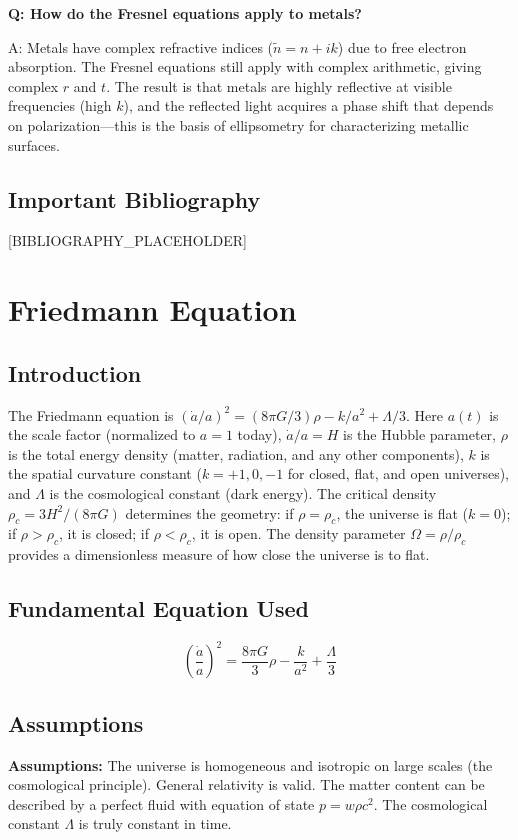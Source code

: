\documentclass[11pt,openright]{book}
\begin{document}
\textbf{Q: How do the Fresnel equations apply to metals?}

A: Metals have complex refractive indices ($\tilde{n} = n + ik$) due to free electron absorption. The Fresnel equations still apply with complex arithmetic, giving complex $r$ and $t$. The result is that metals are highly reflective at visible frequencies (high $k$), and the reflected light acquires a phase shift that depends on polarization---this is the basis of ellipsometry for characterizing metallic surfaces.
\section*{Important Bibliography}

[BIBLIOGRAPHY_PLACEHOLDER]


\chapter{Friedmann Equation}

\section*{Introduction}

The Friedmann equation is $(\dot{a}/a)^2 = (8\pi G/3)\rho - k/a^2 + \Lambda/3$. Here $a(t)$ is the scale factor (normalized to $a = 1$ today), $\dot{a}/a = H$ is the Hubble parameter, $\rho$ is the total energy density (matter, radiation, and any other components), $k$ is the spatial curvature constant ($k = +1, 0, -1$ for closed, flat, and open universes), and $\Lambda$ is the cosmological constant (dark energy). The critical density $\rho_c = 3H^2/(8\pi G)$ determines the geometry: if $\rho = \rho_c$, the universe is flat ($k = 0$); if $\rho > \rho_c$, it is closed; if $\rho < \rho_c$, it is open. The density parameter $\Omega = \rho/\rho_c$ provides a dimensionless measure of how close the universe is to flat.
\section*{Fundamental Equation Used}

\[
\left(\frac{\dot{a}}{a}\right)^2 = \frac{8\pi G}{3}\rho - \frac{k}{a^2} + \frac{\Lambda}{3}
\]
\section*{Assumptions}

\textbf{Assumptions:} The universe is homogeneous and isotropic on large scales (the cosmological principle). General relativity is valid. The matter content can be described by a perfect fluid with equation of state $p = w\rho c^2$. The cosmological constant $\Lambda$ is truly constant in time.
\end{document}
